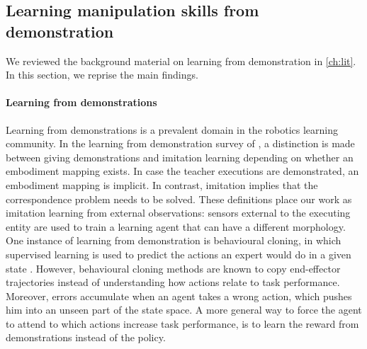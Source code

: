 \documentclass[\home/main.tex]{subfiles}
\begin{document}
\subsection{Learning manipulation skills from demonstration}

We reviewed the background material on learning from demonstration in \cref{ch:lit}. In this section, we reprise the main findings.

\paragraph{Learning from demonstrations}
Learning from demonstrations is a prevalent domain in the robotics learning community. In the learning from demonstration survey of \autocite{Argall2009}, a distinction is made between giving demonstrations and imitation learning depending on whether an embodiment mapping exists. In case the teacher executions are demonstrated, an embodiment mapping is implicit. In contrast, imitation implies that the correspondence problem needs to be solved. These definitions place our work as imitation learning from external observations: sensors external to the executing entity are used to train a learning agent that can have a different morphology. One instance of learning from demonstration is behavioural cloning, in which supervised learning is used to predict the actions an expert would do in a given state \autocite{Ross2011}. However, behavioural cloning methods are known to copy end-effector trajectories instead of understanding how actions relate to task performance. Moreover, errors accumulate when an agent takes a wrong action, which pushes him into an unseen part of the state space. A more general way to force the agent to attend to which actions increase task performance, is to learn the reward from demonstrations instead of the policy.
\end{document}
